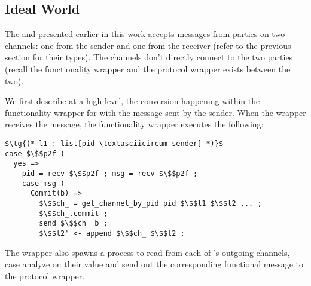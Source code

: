 \subsection{Ideal World}
The \Fcom and presented earlier in this work accepts messages from parties on two channels: one from the sender and one from the receiver (refer to the previous section for their types).
The channels don't directly connect to the two parties (recall the functionality wrapper and the protocol wrapper exists between the two).

We first describe at a high-level, the conversion happening within the functionality wrapper for \Fcom with the  message sent by the sender.
When the wrapper receives the  message, the functionality wrapper executes the following:
\begin{lstlisting}[basicstyle=\small\BeraMonottFamily, frame=single, mathescape]
$\tg{(* l1 : list[pid \textasciicircum sender] *)}$
case $\$$p2f (
  yes => 
    pid = recv $\$$p2f ; msg = recv $\$$p2f ;
    case msg (
      Commit(b) => 
        $\$$ch_ = get_channel_by_pid pid $\$$l1 $\$$l2 ... ;
        $\$$ch_.commit ;
        send $\$$ch_ b ;
        $\$$l2' <- append $\$$ch_ $\$$l2 ;
\end{lstlisting}
The wrapper also spawns a process to read from each of \Fcom's outgoing channels, case analyze on their value and send out the corresponding functional message to the protocol wrapper.

